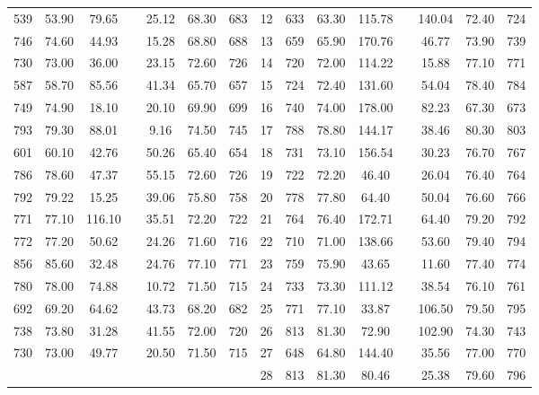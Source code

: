 \documentclass{cumcmart}
\begin{document}
\begin{table}[!htbp]
\begin{tabular}{ccccccccccccccc}
            539  &  53.90  &  79.65   &  &  25.12  &  68.30  &  683  &  12  &  633  &   63.30  &  115.78   &   &  140.04  &   72.40   &   724   \\
            746  &  74.60  &  44.93   &  &  15.28  &  68.80  &  688  &  13  &  659  &   65.90  &  170.76   &   &  46.77   &   73.90   &   739   \\
            730  &  73.00  &  36.00   &  &  23.15  &  72.60  &  726  &  14  &  720  &   72.00  &  114.22   &   &  15.88   &   77.10   &   771   \\
            587  &  58.70  &  85.56   &  &  41.34  &  65.70  &  657  &  15  &  724  &   72.40  &  131.60   &   &  54.04   &   78.40   &   784   \\
            749  &  74.90  &  18.10   &  &  20.10  &  69.90  &  699  &  16  &  740  &   74.00  &  178.00   &   &  82.23   &   67.30   &   673   \\
            793  &  79.30  &  88.01   &  &  9.16   &  74.50  &  745  &  17  &  788  &   78.80  &  144.17   &   &  38.46   &   80.30   &   803   \\
            601  &  60.10  &  42.76   &  &  50.26  &  65.40  &  654  &  18  &  731  &   73.10  &  156.54   &   &  30.23   &   76.70   &   767   \\
            786  &  78.60  &  47.37   &  &  55.15  &  72.60  &  726  &  19  &  722  &   72.20  &  46.40    &   &  26.04   &   76.40   &   764   \\
            792  &  79.22  &  15.25   &  &  39.06  &  75.80  &  758  &  20  &  778  &   77.80  &  64.40    &   &  50.04   &   76.60   &   766   \\
            771  &  77.10  &  116.10  &  &  35.51  &  72.20  &  722  &  21  &  764  &   76.40  &  172.71   &   &  64.40   &   79.20   &   792   \\
            772  &  77.20  &  50.62   &  &  24.26  &  71.60  &  716  &  22  &  710  &   71.00  &  138.66   &   &  53.60   &   79.40   &   794   \\
            856  &  85.60  &  32.48   &  &  24.76  &  77.10  &  771  &  23  &  759  &   75.90  &  43.65    &   &  11.60   &   77.40   &   774   \\
            780  &  78.00  &  74.88   &  &  10.72  &  71.50  &  715  &  24  &  733  &   73.30  &  111.12   &   &  38.54   &   76.10   &   761   \\
            692  &  69.20  &  64.62   &  &  43.73  &  68.20  &  682  &  25  &  771  &   77.10  &  33.87    &   &  106.50  &   79.50   &   795   \\
            738  &  73.80  &  31.28   &  &  41.55  &  72.00  &  720  &  26  &  813  &   81.30  &  72.90    &   &  102.90  &   74.30   &   743   \\
            730  &  73.00  &  49.77   &  &  20.50  &  71.50  &  715  &  27  &  648  &   64.80  &  144.40   &   &  35.56   &   77.00   &   770   \\
                 &         &          &  &         &         &       &  28  &  813  &   81.30  &  80.46    &   &  25.38   &   79.60   &   796   \\


\end{tabular}
\end{table}
\end{document}
